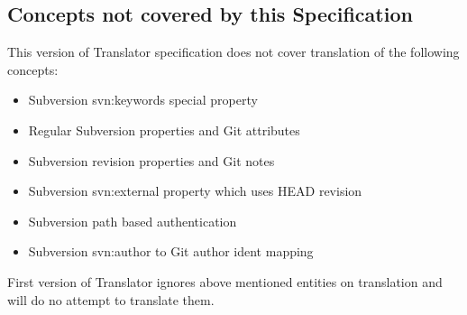 \subsection{Concepts not covered by this Specification}
This version of Translator specification does not cover translation of the following concepts:
\begin{itemize}
\item Subversion svn:keywords special property
\item Regular Subversion properties and Git attributes
\item Subversion revision properties and Git notes
\item Subversion svn:external property which uses HEAD revision
\item Subversion path based authentication
\item Subversion svn:author to Git author ident mapping
\end{itemize}

First version of Translator ignores above mentioned entities on translation and will do no attempt to translate them.